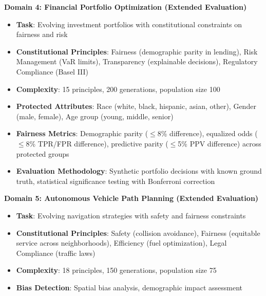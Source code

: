 \documentclass[sigconf,natbib]{acmart}
\begin{document}
\textbf{Domain 4: Financial Portfolio Optimization (Extended Evaluation)}
\begin{itemize}
    \item \textbf{Task}: Evolving investment portfolios with constitutional constraints on fairness and risk
    \item \textbf{Constitutional Principles}: Fairness (demographic parity in lending), Risk Management (VaR limits), Transparency (explainable decisions), Regulatory Compliance (Basel III)
    \item \textbf{Complexity}: 15 principles, 200 generations, population size 100
    \item \textbf{Protected Attributes}: Race (white, black, hispanic, asian, other), Gender (male, female), Age group (young, middle, senior)
    \item \textbf{Fairness Metrics}: Demographic parity ($\leq$8\% difference), equalized odds ($\leq$8\% TPR/FPR difference), predictive parity ($\leq$5\% PPV difference) across protected groups
    \item \textbf{Evaluation Methodology}: Synthetic portfolio decisions with known ground truth, statistical significance testing with Bonferroni correction
\end{itemize}

\textbf{Domain 5: Autonomous Vehicle Path Planning (Extended Evaluation)}
\begin{itemize}
    \item \textbf{Task}: Evolving navigation strategies with safety and fairness constraints
    \item \textbf{Constitutional Principles}: Safety (collision avoidance), Fairness (equitable service across neighborhoods), Efficiency (fuel optimization), Legal Compliance (traffic laws)
    \item \textbf{Complexity}: 18 principles, 150 generations, population size 75
    \item \textbf{Bias Detection}: Spatial bias analysis, demographic impact assessment
\end{itemize}
\end{document}
